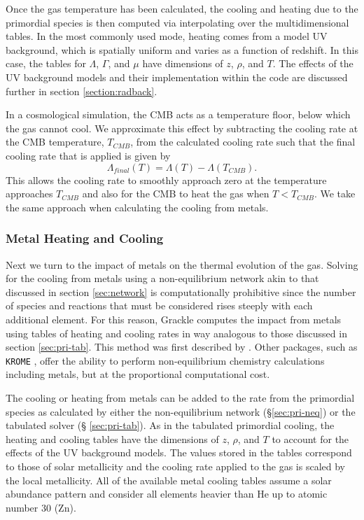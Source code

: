 Once the gas temperature has been calculated, the cooling and heating
due to the primordial species is then computed via interpolating over
the multidimensional tables.  In the most commonly used mode, heating
comes from a model UV background, which is spatially uniform and
varies as a function of redshift.  In this case, the tables for
$\Lambda$, $\Gamma$, and $\mu$ have dimensions of $z$, $\rho$, and
$T$.  The effects of the UV background models and their implementation
within the code are discussed further in section
\ref{section:radback}.

In a cosmological simulation, the CMB acts as a temperature floor,
below which the gas cannot cool.  We approximate this effect by
subtracting the cooling rate at the CMB temperature, $T_{CMB}$, from
the calculated cooling rate such that the final cooling rate that is
applied is given by
\begin{equation}
\Lambda_{final}(T) = \Lambda(T) - \Lambda(T_{CMB}).
\end{equation}
This allows the cooling rate to smoothly approach zero at the
temperature approaches $T_{CMB}$ and also for the CMB to heat the gas
when $T < T_{CMB}$.  We take the same approach when calculating the
cooling from metals.

\subsubsection{Metal Heating and Cooling}

Next we turn to the impact of metals on the thermal evolution of the gas.
Solving for the cooling from metals using a non-equilibrium network
akin to that discussed in section \ref{sec:network} is computationally
prohibitive since the number of species and reactions that must be
considered rises steeply with each additional element.  For this
reason, Grackle computes the impact from metals using tables of
heating and cooling rates in way analogous to those discussed in section
\ref{sec:pri-tab}.  This method was first described by
\citet{2008MNRAS.385.1443S}.  Other packages, such as \texttt{KROME}
\citep{2014MNRAS.439.2386G}, offer the ability to perform
non-equilibrium chemistry calculations including metals, but at the
proportional computational cost.

The cooling or heating from metals can be added to the rate from the
primordial species as calculated by either the non-equilibrium network
(\S \ref{sec:pri-neq}) or the tabulated solver (\S
\ref{sec:pri-tab}).  As in the tabulated primordial cooling, the
heating and cooling tables have the dimensions of $z$, $\rho$, and
$T$ to account for the effects of the UV background models.  The
values stored in the tables correspond to those of solar metallicity
and the cooling rate applied to the gas is scaled by the local
metallicity.  All of the available metal cooling tables assume a solar
abundance pattern and consider all elements heavier than He up to
atomic number 30 (Zn).

